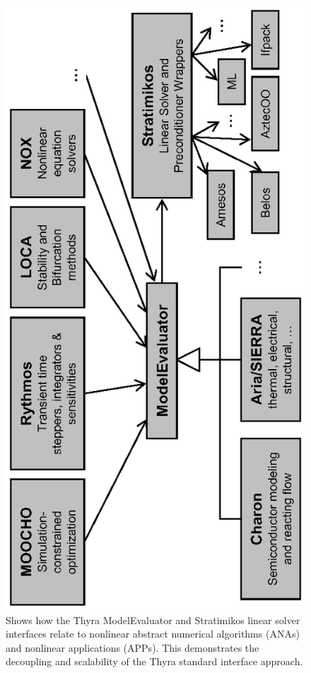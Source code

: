 \documentclass[pdf,ps2pdf,11pt]{SANDreport}
\begin{document}
{\bsinglespace
\begin{figure}
\begin{center}
\includegraphics*[angle=270,scale=0.85
]{ModelEvaluator}
\end{center}
\caption[Thyra ModelEvaluator and linear solver interfaces]{
\label{fig:ModelEvaluator}
Shows how the Thyra ModelEvaluator and Stratimikos linear solver interfaces
relate to nonlinear abstract numerical algorithms (ANAs) and nonlinear
applications (APPs).  This demonstrates the decoupling and scalability of the
Thyra standard interface approach. }
\end{figure}
\esinglespace}
\end{document}
